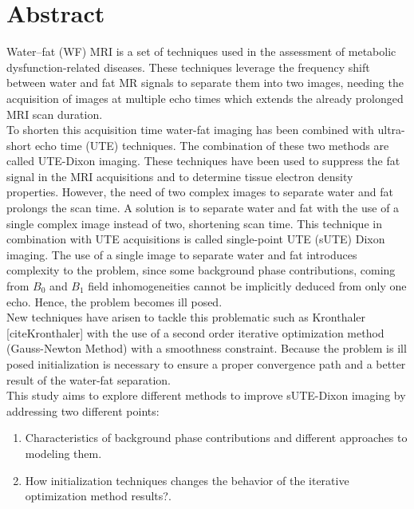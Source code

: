 \begingroup
\let\clearpage\relax
\let\cleardoublepage\relax
\let\cleardoublepage\relax

\chapter*{Abstract}
Water–fat (WF) MRI is a set of techniques used in the assessment of metabolic dysfunction-related diseases. These techniques leverage the frequency shift between water and fat MR signals to separate them into two images, needing the acquisition of images at multiple echo times which extends the already prolonged MRI scan duration.\\

To shorten this acquisition time water-fat imaging has been combined with ultra-short echo time (UTE) techniques. The combination of these two methods are called UTE-Dixon imaging. These techniques have been used to suppress the fat signal in the MRI acquisitions and to determine tissue electron density properties. However, the need of two complex images to separate water and fat prolongs the scan time. A solution is to separate water and fat with the use of a single complex image instead of two, shortening scan time. This technique in combination with UTE acquisitions is called single-point UTE (sUTE) Dixon imaging. The use of a single image to separate water and fat introduces complexity to the problem, since some background phase contributions, coming from $B_0$ and $B_1$ field inhomogeneities cannot be implicitly deduced from only one echo. Hence, the problem becomes ill posed.\\

New techniques have arisen to tackle this problematic such as Kronthaler [citeKronthaler] with the use of a second order iterative optimization method (Gauss-Newton Method) with a smoothness constraint. Because the problem is ill posed initialization is necessary to ensure a proper convergence path and a better result of the water-fat separation.\\

This study aims to explore different methods to improve sUTE-Dixon imaging by addressing two different points:
\begin{enumerate}
\item Characteristics of background phase contributions and different approaches to modeling them. 
\item How initialization techniques changes the behavior of the iterative optimization method results?.
\end{enumerate}

